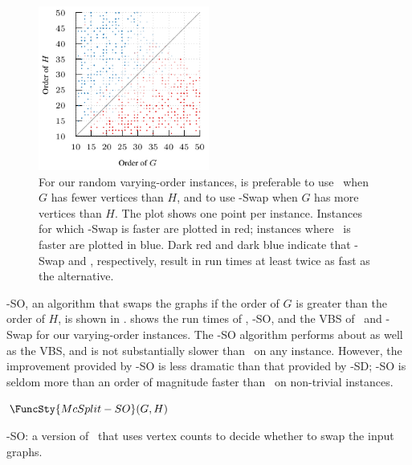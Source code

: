 \begin{figure}[h!]
    \centering
    \includegraphics*[width=0.5\textwidth]{14-mcsplit-i-undirected/modified-mcsplit-experiment/plots/plots/order-when-swap}
    \caption{For our random varying-order instances, is preferable to use \McSplit\ when $G$
        has fewer vertices than $H$, and to use \McSplit-Swap when $G$ has more vertices than $H$.
        The plot shows one point per instance.  Instances for which \McSplit-Swap
        is faster are plotted in red; instances where \McSplit\ is faster
        are plotted in blue.  Dark red and dark blue indicate that \McSplit-Swap and \McSplit,
        respectively, result in run times at least twice as fast as the alternative.}
    \label{figure:order-when-swap}
\end{figure}

\McSplit-SO, an algorithm that swaps the graphs if the order of $G$ is greater
than the order of $H$, is shown in .
 shows the run times of \McSplit,
\McSplit-SO, and the VBS of \McSplit\ and \McSplit-Swap for our varying-order
instances.  The \McSplit-SO
algorithm performs about as well as the VBS, and is not substantially slower
than \McSplit\ on any instance.  However, the improvement provided by
\McSplit-SO is less dramatic than that provided by \McSplit-SD; \McSplit-SO is
seldom more than an order of magnitude faster than \McSplit\ on non-trivial
instances.

\begin{algorithm}[h!]
\AlgorithmFontSizeB
\DontPrintSemicolon
\nl $\FuncSty{McSplit-SO}(G, H)$ \label{McSplitSOFun} \;
\nl {}
    \caption{\McSplit-SO: a version of \McSplit\ that uses vertex counts to decide whether to swap the input graphs.} 
\label{McSplitSOAlg}
\end{algorithm}

